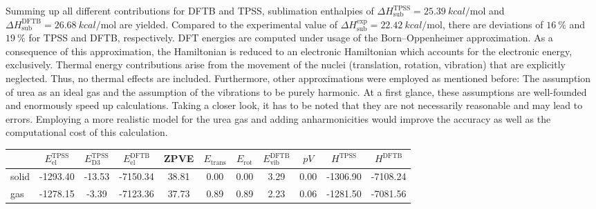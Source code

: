 \documentclass[a4paper,12pt, parskip=half]{scrartcl}
\begin{document}
Summing up all different contributions for DFTB and TPSS, sublimation enthalpies of \linebreak $ \Delta H_\mathrm{sub}^\mathrm{TPSS} =\SI[]{25.39}{kcal\per\mole} $ and $ \Delta H_\mathrm{sub}^\mathrm{DFTB} = \SI[]{26.68}{kcal\per\mole} $ are yielded. Compared to the experimental value of $ \Delta H_\mathrm{sub}^\mathrm{exp} = \SI[]{22.42}{kcal\per\mole} $, there are deviations of $ \SI[]{16}{\percent} $ and $ \SI[]{19}{\percent} $ for TPSS and DFTB, respectively. DFT energies are computed under usage of the Born--Oppenheimer approximation. As a consequence of this approximation, the Hamiltonian is reduced to an electronic Hamiltonian which accounts for the electronic energy, exclusively. Thermal energy contributions arise from the movement of the nuclei (translation, rotation, vibration) that are explicitly neglected. Thus, no thermal effects are included. Furthermore, other approximations were employed as mentioned before: The assumption of urea as an ideal gas and the assumption of the vibrations to be purely harmonic. At a first glance, these assumptions are well-founded and enormously speed up calculations. Taking a closer look, it has to be noted that they are not necessarily reasonable and may lead to errors. Employing a more realistic model for the urea gas and adding anharmonicities would improve the accuracy as well as the computational cost of this calculation.
%
\begin{table}
	\centering
	\label{tab:sublimation}
	\begin{tabular}{l|cccccccccc}
		\toprule
		      & $ E_\mathrm{el}^\mathrm{TPSS} $ &  $ E_\mathrm{D3}^\mathrm{TPSS} $  & $ E_\mathrm{el}^\mathrm{DFTB} $ & ZPVE  & $ E_\mathrm{trans} $ & $ E_\mathrm{rot} $ & $ E_\mathrm{vib}^\mathrm{DFTB} $ & $ pV $ & $ H^\mathrm{TPSS} $& $ H^\mathrm{DFTB} $    \\
		\midrule
		solid & -1293.40     & -13.53                   & -7150.34                        & 38.81 & 0.00                 & 0.00               & 3.29                             & 0.00   & -1306.90& -7108.24 \\
		gas   & -1278.15    & -3.39                    & -7123.36                        & 37.73 & 0.89                 & 0.89               & 2.23                             & 0.06 &-1281.50  & -7081.56 \\

		\bottomrule
	\end{tabular}
\end{table}
%
\newpage
\printbibliography[title={Literature}]
%
\end{document}
